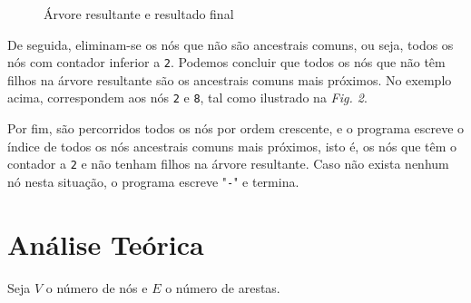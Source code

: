 \documentclass[12pt,a4paper]{article}
\begin{document}
  \begin{figure}
    \centering
    \caption{Árvore resultante e resultado final}
  \end{figure}

  De seguida, eliminam-se os nós que não são ancestrais comuns, ou seja, todos os nós com contador inferior a \texttt{2}.
  Podemos concluir que todos os nós que não têm filhos na árvore resultante são os ancestrais comuns mais próximos. No exemplo acima, correspondem aos nós \texttt{2} e \texttt{8}, tal como ilustrado na \textit{Fig. 2}.

  Por fim, são percorridos todos os nós por ordem crescente, e o programa escreve o índice de todos os nós ancestrais comuns mais próximos, isto é, os nós que têm o contador a \texttt{2} e não tenham filhos na árvore resultante.
  Caso não exista nenhum nó nesta situação, o programa escreve "\texttt{-}" e termina.

  \section{Análise Teórica}

  Seja $V$ o número de nós e $E$ o número de arestas.
\end{document}

